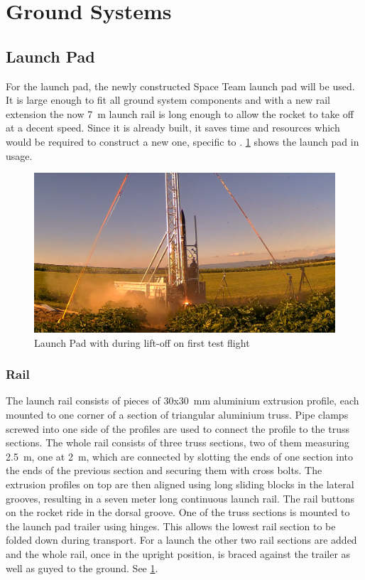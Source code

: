 \section{Ground Systems}
\label{sec:gndsys}
\subsection{Launch Pad} %

For the launch pad, the newly constructed Space Team launch pad will be used. It is large enough to fit all ground system components and with a new rail extension the now \SI{7}{\meter} launch rail is long enough to allow the rocket to take off at a decent speed. Since it is already built, it saves time and resources which would be required to construct a new one, specific to \uH. \cref{fig:gro_lp} shows the launch pad in usage.

\begin{figure}[H]
    \centering
    \includegraphics[width = \textwidth]{GroundSystems/uhb_on_rail.png}
    \caption{Launch Pad with \uH during lift-off on first test flight}
    \label{fig:gro_lp}
\end{figure}

\subsubsection{Rail}
The launch rail consists of pieces of 30x\SI{30}{\milli\meter} aluminium extrusion profile, each mounted to one corner of a section of triangular aluminium truss. Pipe clamps screwed into one side of the profiles are used to connect the profile to the truss sections. The whole rail consists of  three truss sections, two of them measuring \SI{2.5}{\meter}, one at \SI{2}{\meter}, which are connected by slotting the ends of one section into the ends of the previous section and securing them with cross bolts. The extrusion profiles on top are then aligned using long sliding blocks in the lateral grooves, resulting in a seven meter long continuous launch rail. The rail buttons on the rocket ride in the dorsal groove.
One of the truss sections is mounted to the launch pad trailer using hinges. This allows the lowest rail section to be folded down during transport. For a launch the other two rail sections are added and the whole rail, once in the upright position, is braced against the trailer as well as guyed to the ground. See \cref{fig:gro_lp}.

